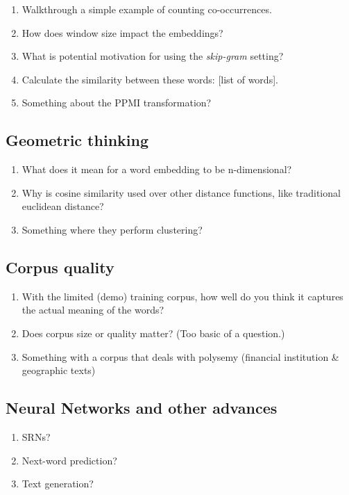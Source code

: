 \begin{enumerate}
\item Walkthrough a simple example of counting co-occurrences.
\item How does window size impact the embeddings?
\item What is potential motivation for using the \textit{skip-gram} setting?
\item Calculate the similarity between these words: [list of words]. 
\item Something about the PPMI transformation?
\end{enumerate}

\subsection{Geometric thinking}

\begin{enumerate}
\item What does it mean for a word embedding to be n-dimensional?
\item Why is cosine similarity used over other distance functions, like traditional euclidean distance?
\item Something where they perform clustering?
\end{enumerate}

\subsection{Corpus quality}

\begin{enumerate}
\item With the limited (demo) training corpus, how well do you think it captures the actual meaning of the words?
\item Does corpus size or quality matter? (Too basic of a question.)
\item Something with a corpus that deals with polysemy (financial institution \& geographic texts)
\end{enumerate}

\subsection{Neural Networks and other advances}

\begin{enumerate}
\item SRNs?
\item Next-word prediction?
\item Text generation?
\end{enumerate}